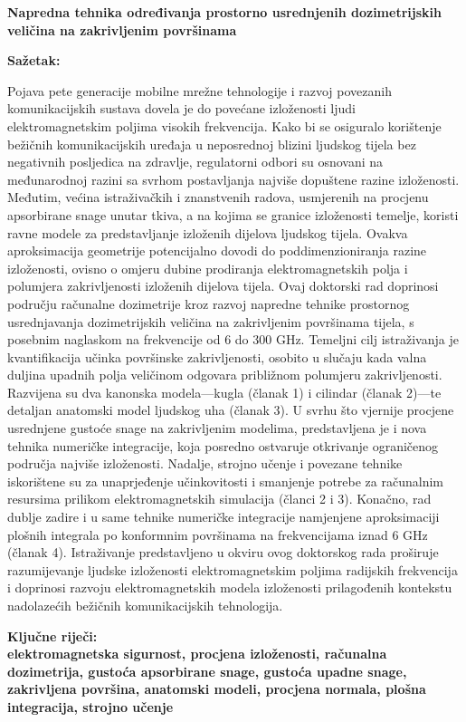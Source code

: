 \setlength{\parindent}{0in}
{\fontsize{14}{18}\bf {Napredna tehnika određivanja prostorno usrednjenih dozimetrijskih veličina na zakrivljenim površinama}}

\vskip 15mm
\textbf{Sa\v{z}etak:\\}
   
\textnormal{Pojava pete generacije mobilne mrežne tehnologije i razvoj povezanih komunikacijskih sustava dovela je do povećane izloženosti ljudi elektromagnetskim poljima visokih frekvencija.
Kako bi se osiguralo korištenje bežičnih komunikacijskih uređaja u neposrednoj blizini ljudskog tijela bez negativnih posljedica na zdravlje, regulatorni odbori su osnovani na međunarodnoj razini sa svrhom postavljanja najviše dopuštene razine izloženosti.
Međutim, većina istraživačkih i znanstvenih radova, usmjerenih na procjenu apsorbirane snage unutar tkiva, a na kojima se granice izloženosti temelje, koristi ravne modele za predstavljanje izloženih dijelova ljudskog tijela.
Ovakva aproksimacija geometrije potencijalno dovodi do poddimenzioniranja razine izloženosti, ovisno o omjeru dubine prodiranja elektromagnetskih polja i polumjera zakrivljenosti izloženih dijelova tijela.
Ovaj doktorski rad doprinosi području računalne dozimetrije kroz razvoj napredne tehnike prostornog usrednjavanja dozimetrijskih veličina na zakrivljenim površinama tijela, s posebnim naglaskom na frekvencije od \num{6} do \num{300} GHz.
Temeljni cilj istraživanja je kvantifikacija učinka površinske zakrivljenosti, osobito u slučaju kada valna duljina upadnih polja veličinom odgovara približnom polumjeru zakrivljenosti.
Razvijena su dva kanonska modela---kugla (članak 1) i cilindar (članak 2)---te detaljan anatomski model ljudskog uha (članak 3).
U svrhu što vjernije procjene usrednjene gustoće snage na zakrivljenim modelima, predstavljena je i nova tehnika numeričke integracije, koja posredno ostvaruje otkrivanje ograničenog područja najviše izloženosti.
Nadalje, strojno učenje i povezane tehnike iskorištene su za unaprjeđenje učinkovitosti i smanjenje potrebe za računalnim resursima prilikom elektromagnetskih simulacija (članci 2 i 3).
Konačno, rad dublje zadire i u same tehnike numeričke integracije namjenjene aproksimaciji plošnih integrala po konformnim površinama na frekvencijama iznad \num{6} GHz (članak 4).
Istraživanje predstavljeno u okviru ovog doktorskog rada proširuje razumijevanje ljudske izloženosti elektromagnetskim poljima radijskih frekvencija i doprinosi razvoju elektromagnetskih modela izloženosti prilagođenih kontekstu nadolazećih bežičnih komunikacijskih tehnologija.}


\vskip 15mm
\bf{Ključne riječi:\\}
\textnormal{elektromagnetska sigurnost, procjena izloženosti, računalna dozimetrija, gustoća apsorbirane snage, gustoća upadne snage, zakrivljena površina, anatomski modeli, procjena normala, plošna integracija, strojno učenje}
